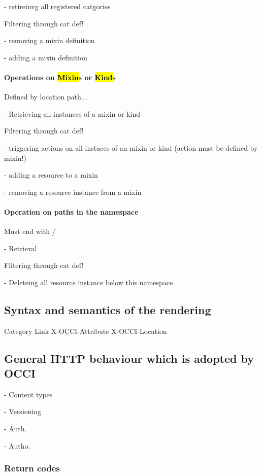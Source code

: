\documentclass[10pt,a4paper]{article}
\begin{document}
- retireinvg all registered catgories

Filtering through cat def!

- removing a mixin definition

- adding a mixin definition

\paragraph{Operations on \hl{Mixin}s or \hl{Kind}s}

Defined by location path....

- Retrieving all instances of a mixin or kind

Filtering through cat def!

- triggering actions on all instaces of an mixin or kind (action must be defined by mixin!)

- adding a resource to a mixin

- removing a resource instance from a mixin

\paragraph{Operation on paths in the namespace}

Must end with /

- Retrieval

Filtering through cat def!

- Deleteing all resource instance below this namespace

\subsection{Syntax and semantics of the rendering}

 Category
 Link
 X-OCCI-Attribute
 X-OCCI-Location

\subsection{General HTTP behaviour which is adopted by OCCI}

- Content types

- Versioning

- Auth.

- Autho.

\subsubsection{Return codes}
\label{sec:return_codes}
\end{document}
